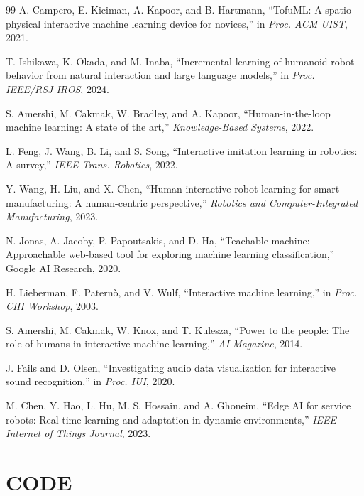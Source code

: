 \documentclass[12pt,a4paper]{report}
\begin{document}
\begin{thebibliography}{99}
A. Campero, E. Kiciman, A. Kapoor, and B. Hartmann, 
``TofuML: A spatio-physical interactive machine learning device for novices,'' 
in \emph{Proc. ACM UIST}, 2021.

T. Ishikawa, K. Okada, and M. Inaba, 
``Incremental learning of humanoid robot behavior from natural interaction and large language models,'' 
in \emph{Proc. IEEE/RSJ IROS}, 2024.

S. Amershi, M. Cakmak, W. Bradley, and A. Kapoor,  
``Human-in-the-loop machine learning: A state of the art,''  
\emph{Knowledge-Based Systems}, 2022.

L. Feng, J. Wang, B. Li, and S. Song,  
``Interactive imitation learning in robotics: A survey,''  
\emph{IEEE Trans. Robotics}, 2022.

Y. Wang, H. Liu, and X. Chen,  
``Human-interactive robot learning for smart manufacturing: A human-centric perspective,''  
\emph{Robotics and Computer-Integrated Manufacturing}, 2023.

N. Jonas, A. Jacoby, P. Papoutsakis, and D. Ha,  
``Teachable machine: Approachable web-based tool for exploring machine learning classification,''  
Google AI Research, 2020.

H. Lieberman, F. Paternò, and V. Wulf,  
``Interactive machine learning,''  
in \emph{Proc. CHI Workshop}, 2003.

S. Amershi, M. Cakmak, W. Knox, and T. Kulesza,  
``Power to the people: The role of humans in interactive machine learning,''  
\emph{AI Magazine}, 2014.

J. Fails and D. Olsen,  
``Investigating audio data visualization for interactive sound recognition,''  
in \emph{Proc. IUI}, 2020.

M. Chen, Y. Hao, L. Hu, M. S. Hossain, and A. Ghoneim,  
``Edge AI for service robots: Real-time learning and adaptation in dynamic environments,''  
\emph{IEEE Internet of Things Journal}, 2023.

\end{thebibliography}


\appendix
\chapter{CODE}
\end{document}
